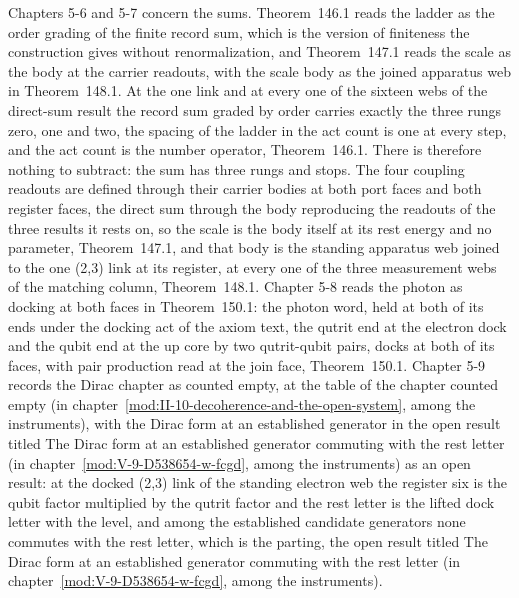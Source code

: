 Chapters 5-6 and 5-7 concern the sums. Theorem~146.1 reads the ladder as the order grading of the finite record sum, which is the version of finiteness the construction gives without renormalization, and Theorem~147.1 reads the scale as the body at the carrier readouts, with the scale body as the joined apparatus web in Theorem~148.1. At the one link and at every one of the sixteen webs of the direct-sum result the record sum graded by order carries exactly the three rungs zero, one and two, the spacing of the ladder in the act count is one at every step, and the act count is the number operator, Theorem~146.1. There is therefore nothing to subtract: the sum has three rungs and stops. The four coupling readouts are defined through their carrier bodies at both port faces and both register faces, the direct sum through the body reproducing the readouts of the three results it rests on, so the scale is the body itself at its rest energy and no parameter, Theorem~147.1, and that body is the standing apparatus web joined to the one (2,3) link at its register, at every one of the three measurement webs of the matching column, Theorem~148.1. Chapter 5-8 reads the photon as docking at both faces in Theorem~150.1: the photon word, held at both of its ends under the docking act of the axiom text, the qutrit end at the electron dock and the qubit end at the up core by two qutrit-qubit pairs, docks at both of its faces, with pair production read at the join face, Theorem~150.1. Chapter 5-9 records the Dirac chapter as counted empty, at the table of the chapter counted empty (in chapter~\ref{mod:II-10-decoherence-and-the-open-system}, among the instruments), with the Dirac form at an established generator in the open result titled The Dirac form at an established generator commuting with the rest letter (in chapter~\ref{mod:V-9-D538654-w-fcgd}, among the instruments) as an open result: at the docked (2,3) link of the standing electron web the register six is the qubit factor multiplied by the qutrit factor and the rest letter is the lifted dock letter with the level, and among the established candidate generators none commutes with the rest letter, which is the parting, the open result titled The Dirac form at an established generator commuting with the rest letter (in chapter~\ref{mod:V-9-D538654-w-fcgd}, among the instruments).

